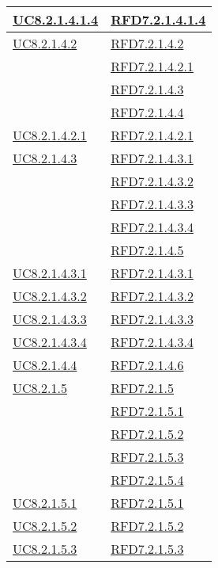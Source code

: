 \begin{longtable}{|>{\centering}m{5cm}|m{5cm}<{\centering}|}
\hyperref[UC8.2.1.4.1.4]{UC8.2.1.4.1.4} & \hyperlink{RFD7.2.1.4.1.4}{RFD7.2.1.4.1.4}\\ \hline
\hyperref[UC8.2.1.4.2]{UC8.2.1.4.2} & \hyperlink{RFD7.2.1.4.2}{RFD7.2.1.4.2}\\
& \hyperlink{RFD7.2.1.4.2.1}{RFD7.2.1.4.2.1}\\
& \hyperlink{RFD7.2.1.4.3}{RFD7.2.1.4.3}\\
& \hyperlink{RFD7.2.1.4.4}{RFD7.2.1.4.4}\\ \hline
\hyperref[UC8.2.1.4.2.1]{UC8.2.1.4.2.1} & \hyperlink{RFD7.2.1.4.2.1}{RFD7.2.1.4.2.1}\\ \hline
\hyperref[UC8.2.1.4.3]{UC8.2.1.4.3} & \hyperlink{RFD7.2.1.4.3.1}{RFD7.2.1.4.3.1}\\
& \hyperlink{RFD7.2.1.4.3.2}{RFD7.2.1.4.3.2}\\
& \hyperlink{RFD7.2.1.4.3.3}{RFD7.2.1.4.3.3}\\
& \hyperlink{RFD7.2.1.4.3.4}{RFD7.2.1.4.3.4}\\
& \hyperlink{RFD7.2.1.4.5}{RFD7.2.1.4.5}\\ \hline
\hyperref[UC8.2.1.4.3.1]{UC8.2.1.4.3.1} & \hyperlink{RFD7.2.1.4.3.1}{RFD7.2.1.4.3.1}\\ \hline
\hyperref[UC8.2.1.4.3.2]{UC8.2.1.4.3.2} & \hyperlink{RFD7.2.1.4.3.2}{RFD7.2.1.4.3.2}\\ \hline
\hyperref[UC8.2.1.4.3.3]{UC8.2.1.4.3.3} & \hyperlink{RFD7.2.1.4.3.3}{RFD7.2.1.4.3.3}\\ \hline
\hyperref[UC8.2.1.4.3.4]{UC8.2.1.4.3.4} & \hyperlink{RFD7.2.1.4.3.4}{RFD7.2.1.4.3.4}\\ \hline
\hyperref[UC8.2.1.4.4]{UC8.2.1.4.4} & \hyperlink{RFD7.2.1.4.6}{RFD7.2.1.4.6}\\ \hline
\hyperref[UC8.2.1.5]{UC8.2.1.5} & \hyperlink{RFD7.2.1.5}{RFD7.2.1.5}\\
& \hyperlink{RFD7.2.1.5.1}{RFD7.2.1.5.1}\\
& \hyperlink{RFD7.2.1.5.2}{RFD7.2.1.5.2}\\
& \hyperlink{RFD7.2.1.5.3}{RFD7.2.1.5.3}\\
& \hyperlink{RFD7.2.1.5.4}{RFD7.2.1.5.4}\\ \hline
\hyperref[UC8.2.1.5.1]{UC8.2.1.5.1} & \hyperlink{RFD7.2.1.5.1}{RFD7.2.1.5.1}\\ \hline
\hyperref[UC8.2.1.5.2]{UC8.2.1.5.2} & \hyperlink{RFD7.2.1.5.2}{RFD7.2.1.5.2}\\ \hline
\hyperref[UC8.2.1.5.3]{UC8.2.1.5.3} & \hyperlink{RFD7.2.1.5.3}{RFD7.2.1.5.3}\\ \hline

\end{longtable}
